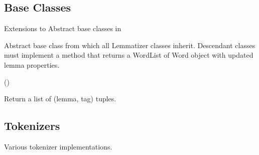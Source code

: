 \documentclass[letterpaper,10pt,english]{sphinxmanual}
\begin{document}
\subsection{Base Classes}
\label{api_reference:base-classes}\label{api_reference:api-base-classes}\label{api_reference:module-textblob_de.base}
Extensions to Abstract base classes in 

\begin{fulllineitems}
\label{api_reference:textblob_de.base.BaseLemmatizer}
Abstract base class from which all Lemmatizer classes inherit.
Descendant classes must implement a  method that returns
a WordList of Word object with updated lemma properties.

()

\begin{fulllineitems}
\label{api_reference:textblob_de.base.BaseLemmatizer.lemmatize}
Return a list of (lemma, tag) tuples.

\end{fulllineitems}


\end{fulllineitems}



\subsection{Tokenizers}
\label{api_reference:tokenizers}\label{api_reference:module-textblob_de.tokenizers}
Various tokenizer implementations.
\end{document}
